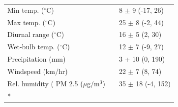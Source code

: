\begin{longtable}[t]{p{5cm}p{4cm}p{5cm}}
\hspace{1em}Min temp. ($^\circ$C) &  & 8 $\pm$ 9 (-17, 26)\\
\hspace{1em}Max temp. ($^\circ$C) &  & 25 $\pm$ 8 (-2, 44)\\
\hspace{1em}Diurnal range ($^\circ$C) &  & 16 $\pm$ 5 (2, 30)\\
\hspace{1em}Wet-bulb temp. ($^\circ$C) &  & 12 $\pm$ 7 (-9, 27)\\
\hspace{1em}Precipitation (mm) &  & 3 + 10 (0, 190)\\
\hspace{1em}Windspeed (km/hr) &  & 22 $\pm$ 7 (8, 74)\\
\hspace{1em}Rel. humidity (%
\hspace{1em}PM 2.5 ($\mu$g/m$^{3}$) &  & 35 $\pm$ 18 (-4, 152)\\*
\end{longtable}
\endgroup{}
